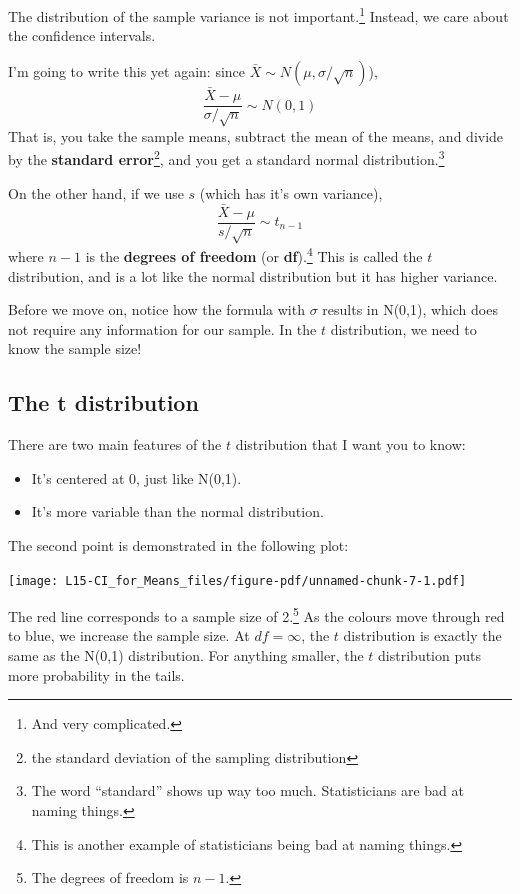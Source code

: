 \documentclass[
  letterpaper,
  DIV=11,
  numbers=noendperiod,
  oneside]{scrreprt}
\providecommand{\tightlist}{%
  \setlength{\itemsep}{0pt}\setlength{\parskip}{0pt}}\usepackage{longtable,booktabs,array}
\begin{document}
The distribution of the sample variance is not important.\footnote{And
  very complicated.} Instead, we care about the confidence intervals.

I'm going to write this yet again: since
\(\bar X\sim N(\mu,\sigma/\sqrt{n})\)), \[
\frac{\bar X - \mu}{\sigma/\sqrt{n}} \sim N(0, 1)
\] That is, you take the sample means, subtract the mean of the means,
and divide by the \textbf{standard error}\footnote{the standard
  deviation of the sampling distribution}, and you get a standard normal
distribution.\footnote{The word ``standard'' shows up way too much.
  Statisticians are bad at naming things.}

On the other hand, if we use \(s\) (which has it's own variance), \[
\frac{\bar X - \mu}{s/\sqrt{n}} \sim t_{n-1}
\] where \(n-1\) is the \textbf{degrees of freedom} (or
\textbf{df}).\footnote{This is another example of statisticians being
  bad at naming things.} This is called the \(t\) distribution, and is a
lot like the normal distribution but it has higher variance.

Before we move on, notice how the formula with \(\sigma\) results in
N(0,1), which does not require any information for our sample. In the
\(t\) distribution, we need to know the sample size!

\hypertarget{the-t-distribution}{%
\subsection{The t distribution}\label{the-t-distribution}}

There are two main features of the \(t\) distribution that I want you to
know:

\begin{itemize}
\tightlist
\item
  It's centered at 0, just like N(0,1).
\item
  It's more variable than the normal distribution.
\end{itemize}

The second point is demonstrated in the following plot:

\texttt{[image: L15-CI\_for\_Means\_files/figure-pdf/unnamed-chunk-7-1.pdf]}

The red line corresponds to a sample size of 2.\footnote{The degrees of
  freedom is \(n-1\).} As the colours move through red to blue, we
increase the sample size. At \(df = \infty\), the \(t\) distribution is
exactly the same as the N(0,1) distribution. For anything smaller, the
\(t\) distribution puts more probability in the tails.
\end{document}
